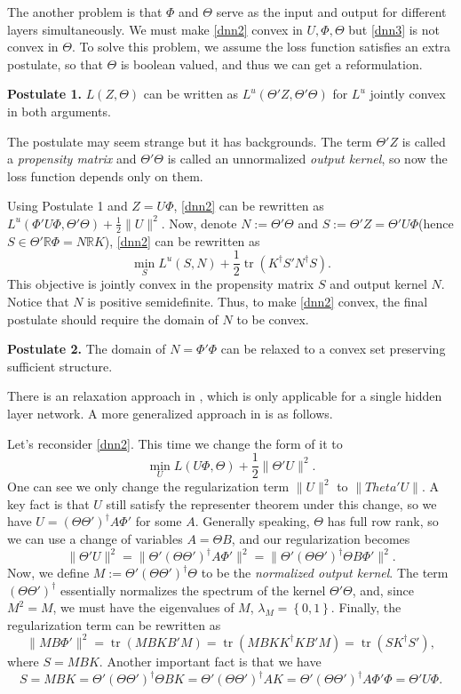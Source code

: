 \documentclass{article}
\DeclareMathOperator{\tr}{tr}
\begin{document}
The another problem is that $\Phi$ and $\Theta$ serve as the input and output for different layers simultaneously. We must make \eqref{dnn2} convex in $U,\Phi,\Theta$ but \eqref{dnn3} is not convex in $\Theta$. To solve this problem, we assume the loss function satisfies an extra postulate, so that $\Theta$ is boolean valued, and thus we can get a reformulation.

\textbf{Postulate 1.} $L(Z,\Theta)$ can be written as $L^u(\Theta'Z,\Theta'\Theta)$ for $L^u$ jointly convex in both arguments.

The postulate may seem strange but it has backgrounds. The term $\Theta'Z$ is called a \emph{propensity matrix} and $\Theta'\Theta$ is called an unnormalized \emph{output kernel}, so now the loss function depends only on them. 

Using Postulate 1 and $Z=U\Phi$, \eqref{dnn2} can be rewritten as $L^u(\Phi'U\Phi,\Theta'\Theta)+\frac{1}{2}\|U\|^2$. Now, denote $N:=\Theta'\Theta$ and $S:=\Theta'Z=\Theta'U\Phi$(hence $S\in\Theta'\mathbb{R}\Phi=N\mathbb{R}K$), \eqref{dnn2} can be rewritten as
\begin{equation}\label{dnn4}
\min_SL^u(S,N)+\frac{1}{2}\tr(K^\dagger S'N^\dagger S).
\end{equation}
This objective is jointly convex in the propensity matrix $S$ and output kernel $N$. Notice that $N$ is positive semidefinite. Thus, to make \eqref{dnn2} convex, the final postulate should require the domain of $N$ to be convex.

\textbf{Postulate 2.} The domain of $N=\Phi'\Phi$ can be relaxed to a convex set preserving sufficient structure.

There is an relaxation approach in \cite{aslan2013convex}, which is only applicable for a single hidden layer network. A more generalized approach in \cite{aslan2014convex} is as follows.

Let's reconsider \eqref{dnn2}. This time we change the form of it to 
\begin{equation}\label{dnn5}
	\min_UL(U\Phi,\Theta)+\frac{1}{2}\|\Theta'U\|^2.
\end{equation}
One can see we only change the regularization term $\|U\|^2$ to $\|Theta'U\|$. A key fact is that $U$ still satisfy the representer theorem under this change, so we have $U=(\Theta\Theta')^\dagger A\Phi'$ for some $A$. Generally speaking, $\Theta$ has full row rank, so we can use a change of variables $A=\Theta B$, and our regularization becomes \[\|\Theta'U\|^2=\|\Theta'(\Theta\Theta')^\dagger A\Phi'\|^2=\|\Theta'(\Theta\Theta')^\dagger\Theta B\Phi'\|^2.\]
Now, we define $M:=\Theta'(\Theta\Theta')^\dagger\Theta$ to be the \emph{normalized output kernel}. The term $(\Theta\Theta')^\dagger$ essentially normalizes the spectrum of the kernel $\Theta'\Theta$, and, since $M^2=M$, we must have the eigenvalues of $M$, $\lambda_{M}=\left\lbrace 0,1\right\rbrace$. Finally, the regularization term can be rewritten as
\[\|MB\Phi'\|^2=\tr(MBKB'M)=\tr(MBKK^\dagger KB'M)=\tr(SK^\dagger S'),\]
where $S=MBK$. Another important fact is that we have 
\[S=MBK=\Theta'(\Theta\Theta')^\dagger\Theta BK=\Theta'(\Theta\Theta')^\dagger AK=\Theta'(\Theta\Theta')^\dagger A\Phi'\Phi=\Theta'U\Phi.\]
\end{document}
